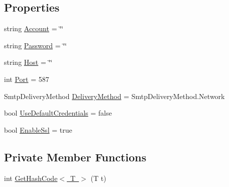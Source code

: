 \subsection*{Properties}
\begin{DoxyCompactItemize}
\item 
string \mbox{\hyperlink{classEmailLib_1_1SmtpServerConfig_adbfdf67c5a1a7cdecc84526812c8858c}{Account}} = \char`\"{}\char`\"{}
\item 
string \mbox{\hyperlink{classEmailLib_1_1SmtpServerConfig_aac1655af1cf16098d62801a8c8150032}{Password}} = \char`\"{}\char`\"{}
\item 
string \mbox{\hyperlink{classEmailLib_1_1SmtpServerConfig_a49540d3aeed5ddc8665bd4354dbec6a7}{Host}} = \char`\"{}\char`\"{}
\item 
int \mbox{\hyperlink{classEmailLib_1_1SmtpServerConfig_a5f790d864fb4922949eab86f3658c544}{Port}} = 587
\item 
Smtp\+Delivery\+Method \mbox{\hyperlink{classEmailLib_1_1SmtpServerConfig_aeac2cdff93ffcfeb97fd35ace14a7af9}{Delivery\+Method}} = Smtp\+Delivery\+Method.\+Network
\item 
bool \mbox{\hyperlink{classEmailLib_1_1SmtpServerConfig_a1e6a775c9811c883436ecfb4d5196bc3}{Use\+Default\+Credentials}} = false
\item 
bool \mbox{\hyperlink{classEmailLib_1_1SmtpServerConfig_a83080d1a9d0b55db612695f6ef525fe9}{Enable\+Ssl}} = true
\end{DoxyCompactItemize}
\subsection*{Private Member Functions}
\begin{DoxyCompactItemize}
\item 
int \mbox{\hyperlink{classEmailLib_1_1SmtpServerConfig_a5352fb785c0a8b7a996381134147a0cb}{Get\+Hash\+Code$<$ T $>$}} (T t)
\end{DoxyCompactItemize}


